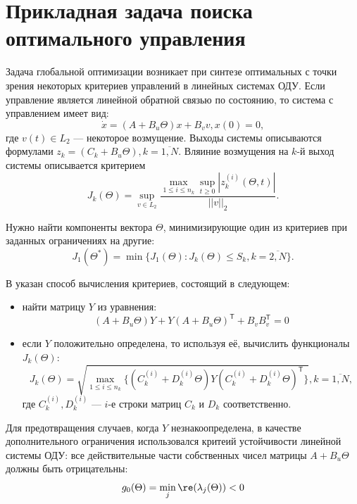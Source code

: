 \section{Прикладная задача поиска оптимального управления}
Задача глобальной оптимизации возникает при синтезе оптимальных с точки зрения некоторых
критериев управлений в линейных системах ОДУ. Если управление является линейной обратной
связью по состоянию, то система с управлением имеет вид:
\begin{equation}
  \label{eq:control_system}
    \dot x = (A+B_u\Theta)x + B_v v, x(0)=0,
\end{equation}
где  \(v(t)\in L_2\) --- некоторое возмущение.
Выходы системы описываются формулами \(z_k=(C_k+B_u\Theta),k=\overline{1,N}\).
Вляиние возмущения на \(k\)-й выход системы описывается критерием
\begin{displaymath}
  J_k(\Theta)=\sup_{v\in L_2} \frac{\max_{1\le i \le n_k} \sup_{t\ge 0}|z_k^{(i)}(\Theta,t)|}{||v||_2}.
\end{displaymath}

Нужно найти компоненты вектора \(\Theta\), минимизирующие один из критериев при
заданных ограничениях на другие:
\begin{displaymath}
   J_1(\Theta^*)=\min\{J_1(\Theta):J_k(\Theta)\leqslant S_k,k=\overline{2,N}\}.
\end{displaymath}

В \cite{optControl} указан способ вычисления критериев, состоящий в следующем:
\begin{itemize}
\item найти матрицу \(Y\) из уравнения:
\begin{displaymath}
  (A+B_u\Theta)Y+Y(A+B_u\Theta)^\mathsf{T}+B_v B_v^\mathsf{T} = 0
\end{displaymath}
\item если \(Y\) положительно определена, то используя её, вычислить функционалы \(J_k(\Theta)\):
\begin{displaymath}
  J_k(\Theta)=\sqrt{\max_{1\leqslant i\leqslant n_k}\{(C_k^{(i)}+D_k^{(i)}\Theta)Y(C_k^{(i)}+D_k^{(i)}\Theta)^\mathsf{T}\}},k=\overline{1,N},
\end{displaymath}
где \(C_k^{(i)},D_k^{(i)}\) --- \(i\)-е строки матриц \(C_k\) и \(D_k\) соответственно.
\end{itemize}

Для предотвращения случаев, когда \(Y\) незнакоопределена, в качестве дополнительного ограничения
использовался критеий устойчивости линейной системы ОДУ: все действительные части
собственных чисел матрицы \(A+B_u\Theta\) должны быть отрицательны:
\begin{displaymath}
  g_0(\Theta)=\min_{j}\re(\lambda_j(\Theta)) < 0
\end{displaymath}

